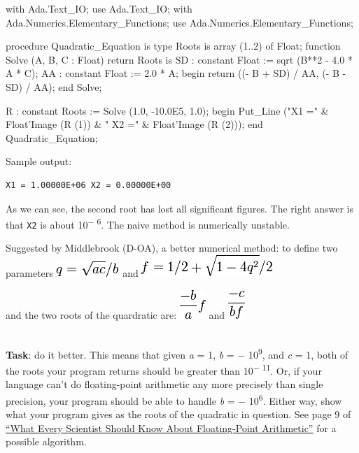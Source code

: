 \begin{wideverbatim}
with Ada.Text_IO;                        use Ada.Text_IO;
with Ada.Numerics.Elementary_Functions;  use Ada.Numerics.Elementary_Functions;
 
procedure Quadratic_Equation is
   type Roots is array (1..2) of Float;
   function Solve (A, B, C : Float) return Roots is
      SD : constant Float := sqrt (B**2 - 4.0 * A * C);
      AA : constant Float := 2.0 * A;
   begin
      return ((- B + SD) / AA, (- B - SD) / AA);
   end Solve;
 
   R : constant Roots := Solve (1.0, -10.0E5, 1.0);
begin
   Put_Line ("X1 =" & Float'Image (R (1)) & " X2 =" & Float'Image (R (2)));
end Quadratic_Equation;
\end{wideverbatim}

Sample output:

\begin{verbatim}
X1 = 1.00000E+06 X2 = 0.00000E+00
\end{verbatim}

As we can see, the second root has lost all significant figures. The
right answer is that \texttt{X2} is about 10\textsuperscript{− 6}. The
naive method is numerically unstable.

Suggested by Middlebrook (D-OA), a better numerical method: to define
two parameters
\includegraphics[scale=.6]{graphics/1b0829cacb50a2b671f2807fe80c911c.png}
and
\includegraphics[scale=.6]{graphics/688bcacb300f8efe5d6d8f6411d13d96.png}

and the two roots of the quardratic are:
\includegraphics[scale=.6]{graphics/4bcc0c5a2bb6223fa81b5bc6f0001367.png}
and
\includegraphics[scale=.6]{graphics/06242fdab96c6fc34555b2d3ac36ff56.png}

\\ \textbf{Task}: do it better. This means that given \emph{a} = 1,
\emph{b} = − 10\textsuperscript{9}, and \emph{c} = 1, both of the roots
your program returns should be greater than 10\textsuperscript{− 11}.
Or, if your language can't do floating-point arithmetic any more
precisely than single precision, your program should be able to handle
\emph{b} = − 10\textsuperscript{6}. Either way, show what your program
gives as the roots of the quadratic in question. See page 9 of
\href{http://dlc.sun.com/pdf/800-7895/800-7895.pdf}{``What Every
Scientist Should Know About Floating-Point Arithmetic''} for a possible
algorithm.

